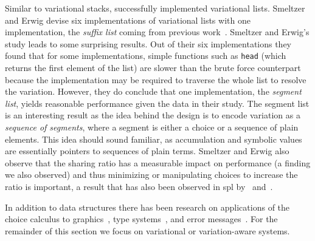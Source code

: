 Similar to variational stacks, \citet{SE17fosd} successfully implemented
variational lists. Smeltzer and Erwig devise six implementations of variational
lists with one implementation, the \emph{suffix list} coming from previous
work~\cite{EW11gttse}. Smeltzer and Erwig's study leads to some surprising
results. Out of their six implementations they found that for some
implementations, simple functions such as \texttt{head} (which returns the first
element of the list) are slower than the brute force counterpart because the
implementation may be required to traverse the whole list to resolve the
variation. However, they do conclude that one implementation, the \emph{segment
  list}, yields reasonable performance given the data in their study. The
segment list is an interesting result as the idea behind the design is to encode
variation as a \emph{sequence of segments}, where a segment is either a choice
or a sequence of plain elements. This idea should sound familiar, as
accumulation and symbolic values are essentially pointers to sequences of plain
terms. Smeltzer and Erwig also observe that the sharing ratio has a measurable
impact on performance (a finding we also observed) and thus minimizing or
manipulating choices to increase the ratio is important, a result that has also
been observed in \ac{spl} by~\citet{ARW+:ICSE13} and~\citet{KRE+:FOSD12}.

In addition to data structures there has been research on applications of the
choice calculus to graphics~\citep{ES18diagrams}, type
systems~\citep{CCEW18popl,CCW18icfp,CEW:TOPLAS14,CEW12icfp}, and error
messages~\citep{CES17jvlc,CE14popl,CEW12icfp,CES14hcc}. For the remainder of
this section we focus on variational or variation-aware systems.

